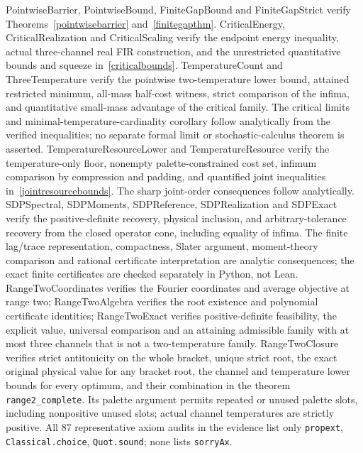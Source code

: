 \documentclass[11pt]{article}
\begin{document}
PointwiseBarrier, PointwiseBound, FiniteGapBound and FiniteGapStrict verify Theorems~\ref{pointwisebarrier} and~\ref{finitegapthm}. CriticalEnergy, CriticalRealization and CriticalScaling verify the endpoint energy inequality, actual three-channel real FIR construction, and the unrestricted quantitative bounds and squeeze in~\eqref{criticalbounds}. TemperatureCount and ThreeTemperature verify the pointwise two-temperature lower bound, attained restricted minimum, all-mass half-cost witness, strict comparison of the infima, and quantitative small-mass advantage of the critical family. The critical limits and minimal-temperature-cardinality corollary follow analytically from the verified inequalities; no separate formal limit or stochastic-calculus theorem is asserted. TemperatureResourceLower and TemperatureResource verify the temperature-only floor, nonempty palette-constrained cost set, infimum comparison by compression and padding, and quantified joint inequalities in~\eqref{jointresourcebounds}. The sharp joint-order consequences follow analytically. SDPSpectral, SDPMoments, SDPReference, SDPRealization and SDPExact verify the positive-definite recovery, physical inclusion, and arbitrary-tolerance recovery from the closed operator cone, including equality of infima. The finite lag/trace representation, compactness, Slater argument, moment-theory comparison and rational certificate interpretation are analytic consequences; the exact finite certificates are checked separately in Python, not Lean. RangeTwoCoordinates verifies the Fourier coordinates and average objective at range two; RangeTwoAlgebra verifies the root existence and polynomial certificate identities; RangeTwoExact verifies positive-definite feasibility, the explicit value, universal comparison and an attaining admissible family with at most three channels that is not a two-temperature family. RangeTwoClosure verifies strict antitonicity on the whole bracket, unique strict root, the exact original physical value for any bracket root, the channel and temperature lower bounds for every optimum, and their combination in the theorem \texttt{range2\_complete}. Its palette argument permits repeated or unused palette slots, including nonpositive unused slots; actual channel temperatures are strictly positive. All 87 representative axiom audits in the evidence list only \texttt{propext}, \texttt{Classical.choice}, \texttt{Quot.sound}; none lists \texttt{sorryAx}.
\end{document}
